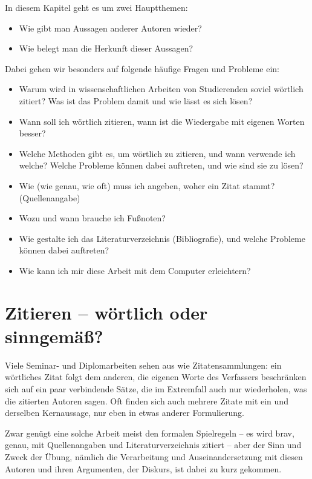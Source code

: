 \documentclass[]{book}
\providecommand{\tightlist}{%
  \setlength{\itemsep}{0pt}\setlength{\parskip}{0pt}}
\theoremstyle{definition}
\theoremstyle{definition}
\theoremstyle{definition}
\theoremstyle{remark}
\begin{document}
In diesem Kapitel geht es um zwei Hauptthemen:

\begin{itemize}
\tightlist
\item
  Wie gibt man Aussagen anderer Autoren wieder?
\item
  Wie belegt man die Herkunft dieser Aussagen?
\end{itemize}

Dabei gehen wir besonders auf folgende häufige Fragen und Probleme ein:

\begin{itemize}
\tightlist
\item
  Warum wird in wissenschaftlichen Arbeiten von Studierenden soviel
  wörtlich zitiert? Was ist das Problem damit und wie lässt es sich
  lösen?
\item
  Wann soll ich wörtlich zitieren, wann ist die Wiedergabe mit eigenen
  Worten besser?
\item
  Welche Methoden gibt es, um wörtlich zu zitieren, und wann verwende
  ich welche? Welche Probleme können dabei auftreten, und wie sind sie
  zu lösen?
\item
  Wie (wie genau, wie oft) muss ich angeben, woher ein Zitat stammt?
  (Quellenangabe)
\item
  Wozu und wann brauche ich Fußnoten?
\item
  Wie gestalte ich das Literaturverzeichnis (Bibliografie), und welche
  Probleme können dabei auftreten?
\item
  Wie kann ich mir diese Arbeit mit dem Computer erleichtern?
\end{itemize}

\section{Zitieren -- wörtlich oder
sinngemäß?}\label{zitieren-wortlich-oder-sinngema}

Viele Seminar- und Diplomarbeiten sehen aus wie Zitatensammlungen: ein
wörtliches Zitat folgt dem anderen, die eigenen Worte des Verfassers
beschränken sich auf ein paar verbindende Sätze, die im Extremfall auch
nur wiederholen, was die zitierten Autoren sagen. Oft finden sich auch
mehrere Zitate mit ein und derselben Kernaussage, nur eben in etwas
anderer Formulierung.

Zwar genügt eine solche Arbeit meist den formalen Spielregeln -- es wird
brav, genau, mit Quellenangaben und Literaturverzeichnis zitiert -- aber
der Sinn und Zweck der Übung, nämlich die Verarbeitung und
Auseinandersetzung mit diesen Autoren und ihren Argumenten, der Diskurs,
ist dabei zu kurz gekommen.
\end{document}
